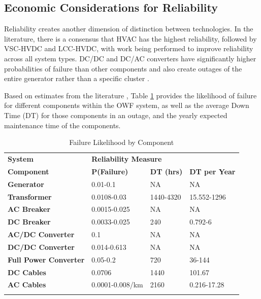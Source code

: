 \documentclass{ieeeaccess}
\begin{document}
 \subsection{\textbf{Economic Considerations for Reliability}}

Reliability creates another dimension of distinction between technologies. In the literature, there is a consensus that HVAC has the highest reliability, followed by VSC-HVDC and LCC-HVDC, with work being performed to improve reliability across all system types. DC/DC and DC/AC converters have significantly higher probabilities of failure than other components and also create outages of the entire generator rather than a specific cluster \cite{sun2021reliability}.

Based on estimates from the literature \cite{sun2021reliability,maciver2015reliability,li2021review,lakshmanan2021electrical,yang2022critical}, Table \ref{Failure} provides the likelihood of failure for different components within the OWF system, as well as the average Down Time (DT) for those components in an outage, and the yearly expected maintenance time of the components.


\begin{table}[htbp]
\caption{Failure Likelihood by Component}
\label{Failure}
 \renewcommand{\arrayrulewidth}{1.1pt}
 \renewcommand{\tabcolsep}{2pt}
 \renewcommand{\arraystretch}{1.1}
 \small
\centering
\begin{tabular}{|
p{1.9cm}<{\raggedright\arraybackslash}|
m{2.2cm}<{\centering}|
m{1.6cm}<{\centering}|
m{1.7cm}<{\centering}|}
\hline
\textbf{System} & \multicolumn{3}{l|}{\textbf{Reliability Measure}} \\
\hhline{|>{\arrayrulecolor{white}}-|>{\arrayrulecolor{black}}---}
\textbf{Component} & {\bfseries P(Failure)} & {\bfseries DT (hrs)} & {\bfseries DT per Year} \\
\hline
\textbf{Generator} & 0.01-0.1 & NA & NA \\
\hline
\textbf{Transformer} & 0.0108-0.03 & 1440-4320 & 15.552-1296 \\
\hline
\textbf{AC Breaker} & 0.0015-0.025 & NA & NA \\
\hline
\textbf{DC Breaker} & 0.0033-0.025 & 240 & 0.792-6 \\
\hline
\textbf{AC/DC Converter} & 0.1 & NA & NA \\
\hline
\textbf{DC/DC Converter} & 0.014-0.613 & NA & NA \\
\hline
\textbf{Full Power Converter} & 0.05-0.2 & 720 & 36-144 \\
\hline
\textbf{DC Cables} & 0.0706 & 1440 & 101.67 \\
\hline
\textbf{AC Cables} & 0.0001-0.008/km & 2160 & 0.216-17.28 \\
\hline
\multicolumn{4}{l}{}
\end{tabular}
\end{table}
\end{document}
